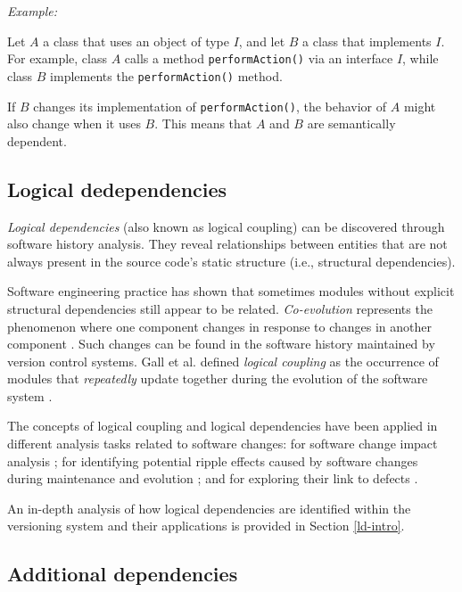 \textit{Example:}

Let \(A\) a class that uses an object of type \(I\), and let \(B\) a class that implements \(I\). For example, class \(A\) calls a method \texttt{performAction()} via an interface \(I\), while class \(B\) implements the \texttt{performAction()} method.

If \(B\) changes its implementation of \texttt{performAction()}, the behavior of \(A\) might also change when it uses \(B\). This means that \(A\) and \(B\) are semantically dependent.



\subsection{Logical dedependencies}
\hspace{4em} \textit{Logical dependencies} (also known as logical coupling) can be discovered through software history analysis. They reveal relationships between entities that are not always present in the source code's static structure (i.e., structural dependencies).

Software engineering practice has shown that sometimes modules without explicit structural dependencies still appear to be related. \textit{Co-evolution} represents the phenomenon where one component changes in response to changes in another component \cite{Yu:2007:UCC:1231330.1231370, Cataldo2009SoftwareDW}. Such changes can be found in the software history maintained by version control systems. Gall et al. defined \textit{logical coupling} as the occurrence of modules that \emph{repeatedly} update together during the evolution of the software system \cite{Gall:1998:DLC:850947.853338, Gall:2003:CRH:942803.943741, 6606615}.

The concepts of logical coupling and logical dependencies have been applied in different analysis tasks related to software changes: for software change impact analysis \cite{1553643}; for identifying potential ripple effects caused by software changes during maintenance and evolution \cite{DBLP:conf/issre/OlivaG15, Oliva:2011:ISL:2067853.2068086, Poshyvanyk2009, posh2010}; and for exploring their link to defects \cite{wiese, Zimmermann:2004:MVH:998675.999460}.

An in-depth analysis of how logical dependencies are identified within the versioning system and their applications is provided in Section \ref{ld-intro}.



\subsection{Additional dependencies}

